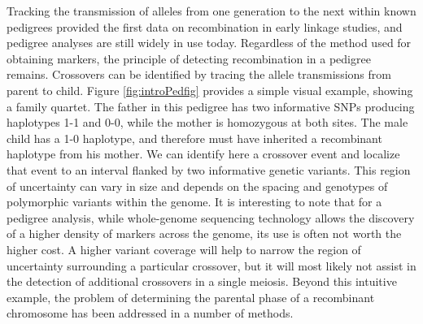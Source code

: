 Tracking the transmission of alleles from one generation to the next within known pedigrees provided the first data on recombination in early linkage studies, and pedigree analyses are still widely in use today.
Regardless of the method used for obtaining markers, the principle of detecting recombination in a pedigree remains.
Crossovers can be identified by tracing the allele transmissions from parent to child.
Figure \ref{fig:introPedfig} provides a simple visual example, showing a family quartet.
The father in this pedigree has two informative SNPs producing haplotypes 1-1 and 0-0, while the mother is homozygous at both sites.
The male child has a 1-0 haplotype, and therefore must have inherited a recombinant haplotype from his mother.
We can identify here a crossover event and localize that event to an interval flanked by two informative genetic variants.
This region of uncertainty can vary in size and depends on the spacing and genotypes of polymorphic variants within the genome.
It is interesting to note that for a pedigree analysis, 
while whole-genome sequencing technology allows the discovery of a higher density of markers across the genome, its use is often not worth the higher cost.
A higher variant coverage will help to narrow the region of uncertainty surrounding a particular crossover, but it will most likely not assist in the detection of additional crossovers in a single meiosis.
Beyond this intuitive example, the problem of determining the parental phase of a recombinant chromosome has been addressed in a number of methods.
%

